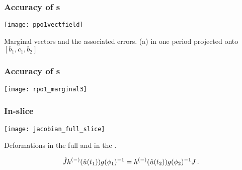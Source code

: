  


\begin{frame}%
  \frametitle{Accuracy of \Fv s}

  {\centering
    \texttt{[image: ppo1vectfield]}
    \par}
  {\scriptsize \centering
    Marginal vectors and the associated errors.
    (a)  in one period projected onto
    {$[b_1, c_{1}, b_{2}]$}
  }

\end{frame}

\begin{frame}%
  \frametitle{Accuracy of \Fv s}

  
  {\centering
    \texttt{[image: rpo1\_marginal3]}
    \par}

\end{frame}

\begin{frame}[shrink]%
  \frametitle{In-slice \JacobianM}

  {\centering
    \texttt{[image: jacobian\_full\_slice]}
    \par}
  {\scriptsize \centering 
    Deformations in
    the full {\statesp} and in the \slice.
    \par}
  \[
    \hat{J}h^{(-)}
    (\hat{u}(t_1))g({\bf \phi}_1)^{-1}=
    h^{(-)}(\hat{u}(t_2))g({\bf \phi}_2)^{-1}J
    \,.
  \]
  \pause
  \htb{
    \[
      \hat{\ExpaEig}_{j} = \ExpaEig_{j} \,, \quad
      \jEigvecRed[j] = \pMatM(\sspRed_p)\LieEl(\gSpace_p)^{-1} \jEigvecRed[j]
      \,.
    \]
  }

\end{frame}
